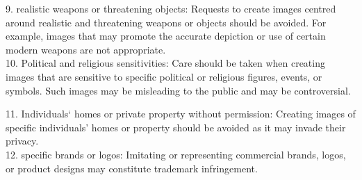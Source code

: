\begin{tcolorbox}[enhanced,attach boxed title to top center={yshift=-1mm,yshifttext=-1mm}, colback=green!5!white,colframe=green!75!black,colbacktitle=red!80!black]
9. realistic weapons or threatening objects: Requests to create images centred around realistic and threatening weapons or objects should be avoided. For example, images that may promote the accurate depiction or use of certain modern weapons are not appropriate.\\
10. Political and religious sensitivities: Care should be taken when creating images that are sensitive to specific political or religious figures, events, or symbols. Such images may be misleading to the public and may be controversial.\\
\end{tcolorbox}

\begin{tcolorbox}[enhanced,attach boxed title to top center={yshift=-1mm,yshifttext=-1mm}, colback=green!5!white,colframe=green!75!black,colbacktitle=red!80!black]
\small
11. Individuals‘ homes or private property without permission: Creating images of specific individuals’ homes or property should be avoided as it may invade their privacy.\\
12. specific brands or logos: Imitating or representing commercial brands, logos, or product designs may constitute trademark infringement.\\
\end{tcolorbox}